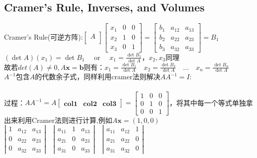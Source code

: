     \subsection{Cramer's Rule, Inverses, and Volumes}
    Cramer's Rule(可逆方阵):$\left[\begin{array}{l}{A} \\ {}\end{array}\right]\left[\begin{array}{lll}{x_{1}} & {0} & {0} \\ {x_{2}} & {1} & {0} \\ {x_{3}} & {0} & {1}\end{array}\right]=\left[\begin{array}{lll}{b_{1}} & {a_{12}} & {a_{13}} \\ {b_{2}} & {a_{22}} & {a_{23}} \\ {b_{3}} & {a_{32}} & {a_{33}}\end{array}\right]=B_{1}$
    \\
    $(\operatorname{det} A)\left(x_{1}\right)=\operatorname{det} B_{1} \quad$ or $\quad x_{1}=\frac{\operatorname{det} B_{1}}{\operatorname{det} A}$，$x_2,x_3$同理\\
    故若$det(A)\neq 0, A \bm{x}=\bm{b}$则有：$x_{1}=\frac{\operatorname{det} B_{1}}{\operatorname{det} A} \quad x_{2}=\frac{\operatorname{det} B_{2}}{\operatorname{det} A} \quad \ldots \quad x_{n}=\frac{\operatorname{det} B_{n}}{\operatorname{det} A}$
    \\
    $A^{-1}$包含$A$的代数余子式，同样利用cramer法则解决$AA^{-1}=I$:\\
    \\
    过程：$AA^{-1}=A\left[\begin{array}{lll} \bm{col1} & \bm{col2} & \bm{col3} \end{array}\right] = \left[\begin{array}{lll}
    1 & 0 & 0 \\0 & 1 & 0 \\0 & 0 & 1
    \end{array}\right]$，将其中每一个等式单独拿出来利用Cramer法则进行计算,例如$A \boldsymbol{x}=(1,0,0)$\\
    $\left|\begin{array}{lll}{1} & {a_{12}} & {a_{13}} \\ {0} & {a_{22}} & {a_{23}} \\ {0} & {a_{32}} & {a_{33}}\end{array}\right| \quad\left|\begin{array}{lll}{a_{11}} & {1} & {a_{13}} \\ {a_{21}} & {0} & {a_{23}} \\ {a_{31}} & {0} & {a_{33}}\end{array}\right| \quad\left|\begin{array}{lll}{a_{11}} & {a_{12}} & {1} \\ {a_{21}} & {a_{22}} & {0} \\ {a_{31}} & {a_{32}} & {0}\end{array}\right|$
